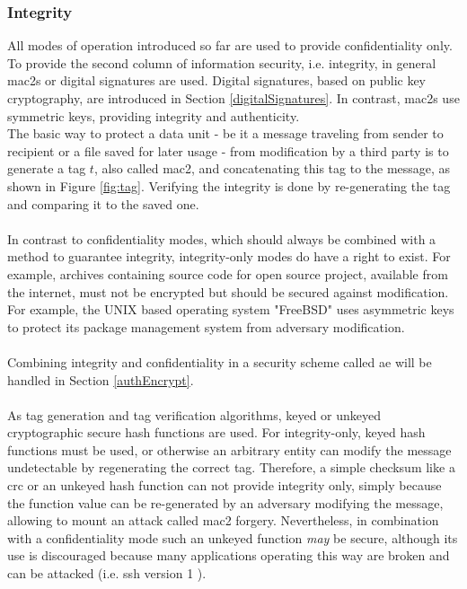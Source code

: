 \subsubsection{Integrity}\label{Integrity}
All modes of operation introduced so far are used to provide confidentiality only. To provide the second column of information security, i.e. integrity, in general
\glspl{mac2} or digital signatures are used.
Digital signatures, based on public key cryptography, are introduced in Section \ref{digitalSignatures}. In contrast, \glspl{mac2} use symmetric keys,
providing integrity and authenticity. 
\\
The basic way to protect a data unit - be it a message traveling from sender to recipient or a file saved for later usage - from modification by a third party is to
generate a tag $t$, also called \gls{mac2}, and concatenating this tag to the message, as shown in Figure \ref{fig:tag}.
Verifying the integrity is done by re-generating the tag and comparing it to the saved one. 
\\
\\
In contrast to confidentiality modes, which should always be combined with a method to guarantee integrity, 
integrity-only modes do have a right to exist. For example, archives containing source code for open source project, available from the internet, must not be
encrypted but should be secured against modification. For example, the UNIX based operating system "FreeBSD" uses asymmetric keys to protect its package
management system from adversary modification.
\\
\\
Combining integrity and confidentiality in a security scheme called \gls{ae} will be handled in Section \ref{authEncrypt}.
\\
\\
As tag generation and tag verification algorithms, keyed or unkeyed cryptographic secure hash functions are used.
For integrity-only, keyed hash functions must be used, or
otherwise an arbitrary entity can modify the message undetectable by regenerating the correct tag. Therefore, a simple checksum like a \gls{crc} or an unkeyed 
hash function can not provide integrity only, simply because the function value can be re-generated by an adversary modifying the message, allowing to mount
an attack called \gls{mac2} forgery.
Nevertheless, in combination with a confidentiality mode such an unkeyed function \textit{may} be secure, although its use is discouraged because many applications operating
this way are broken and can be attacked (i.e. \gls{ssh} version 1 \cite{zalewskissh}).
